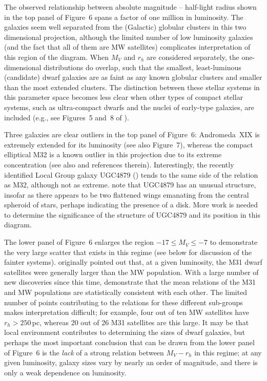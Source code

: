 \documentclass[manuscript]{aastex}
\begin{document}
The observed relationship between absolute magnitude -- half-light
radius shown in the top panel of Figure~6 spans a factor of one
million in luminosity. The galaxies
seem well separated from the (Galactic) globular clusters in this two
dimensional projection, although the limited number of low luminosity
galaxies (and the fact that all of them are MW satellites) complicates
interpretation of this region of the diagram. When $M_V$ and $r_h$ are
considered separately, the one-dimensional distributions do overlap,
such that the smallest, least-luminous (candidate) dwarf galaxies are as
faint as any known globular clusters and smaller than the most
extended clusters. The distinction between these stellar systems in
this parameter space becomes less clear when other types of compact
stellar systems, such as ultra-compact dwarfs and the nuclei of
early-type galaxies, are included (e.g., see Figures~5 and~8 of
\citealt{brodie2011}).

Three galaxies are clear outliers in the top panel of Figure~6: Andromeda~XIX is
extremely extended for its luminosity (see also Figure~7), whereas the
compact elliptical M32 is a known outlier in this projection due to
its extreme concentration (see also \citealt{kormendy2012} and
references therein). Interestingly, the recently identified
Local Group galaxy UGC4879 (\citealt{kopylov2008}) tends to the same
side of the relation as M32, although not as
extreme. \cite{bellazzini2011} note that UGC4879 has an unusual
structure, insofar as there appears to be two flattened wings
emanating from the central spheroid of stars, perhaps indicating the
presence of a disk. More work is needed to determine the significance
of the structure of UGC4879 and its position in this diagram.

The lower panel of Figure~6 enlarges the region $-17\le M_V\le-7$ to
demonstrate the very large scatter that exists in this regime (see
below for discussion of the fainter systems). \cite{mcconnachie2006b}
originally pointed out that, at a given luminosity, the M31 dwarf
satellites were generally larger than the MW population. With a large
number of new discoveries since this time, \cite{brasseur2011b}
demonstrate that the mean relations of the M31 and MW populations are
statistically consistent with each other. The limited number of points
contributing to the relations for these different sub-groups makes
interpretation difficult; for example, four out of ten MW satellites
have $r_h>250$\,pc, whereas 20 out of 26 M31 satellites are this
large. It may be that local environment contributes to determining the
sizes of dwarf galaxies, but perhaps the most important conclusion
that can be drawn from the lower panel of Figure~6 is the {\it lack}
of a strong relation between $M_V - r_h$ in this regime; at any given
luminosity, galaxy sizes vary by nearly an order of magnitude, and
there is only a weak dependence on luminosity.
\end{document}
